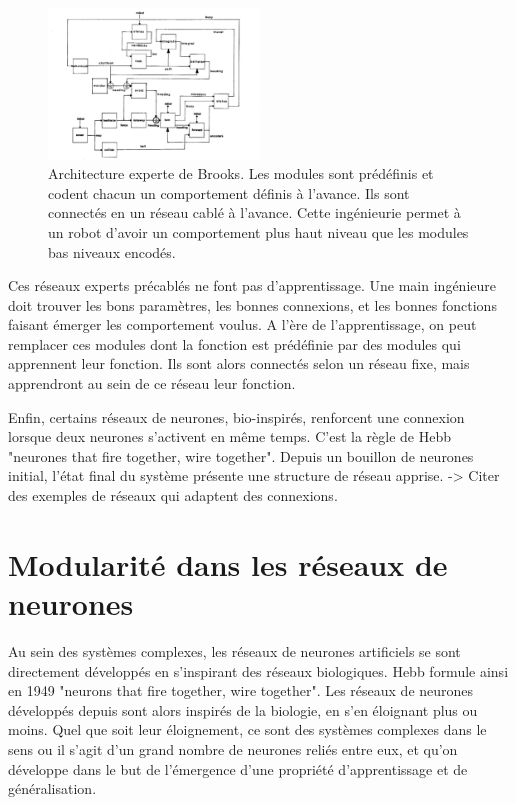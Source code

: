\begin{figure}
\centering
\includegraphics[width=0.5\textwidth]{brooks.pdf}
\caption{Architecture experte de Brooks. Les modules sont prédéfinis et codent chacun un comportement définis à l'avance. Ils sont connectés en un réseau cablé à l'avance. Cette ingénieurie permet à un robot d'avoir un comportement plus haut niveau que les modules bas niveaux encodés.}
\label{fig:brooks}
\end{figure}

Ces réseaux experts précablés ne font pas d'apprentissage. Une main ingénieure doit trouver les bons paramètres, les bonnes connexions, et les bonnes fonctions faisant émerger les comportement voulus. A l'ère de l'apprentissage, on peut remplacer ces modules dont la fonction est prédéfinie par des modules qui apprennent leur fonction. Ils sont alors connectés selon un réseau fixe, mais apprendront au sein de ce réseau leur fonction. 

Enfin, certains réseaux de neurones, bio-inspirés, renforcent une connexion lorsque deux neurones s'activent en même temps. C'est la règle de Hebb "neurones that fire together, wire together". Depuis un bouillon de neurones initial, l'état final du système présente une structure de réseau apprise.  -> Citer des exemples de réseaux qui adaptent des connexions. 
 

\section{Modularité dans les réseaux de neurones}

Au sein des systèmes complexes, les réseaux de neurones artificiels se sont directement développés en s'inspirant des réseaux biologiques. Hebb formule ainsi en 1949 "neurons that fire together, wire together". Les réseaux de neurones développés depuis sont alors inspirés de la biologie, en s'en éloignant plus ou moins. Quel que soit leur éloignement, ce sont des systèmes complexes dans le sens ou il s'agit d'un grand nombre de neurones reliés entre eux, et qu'on développe dans le but de l'émergence d'une propriété d'apprentissage et de généralisation.

